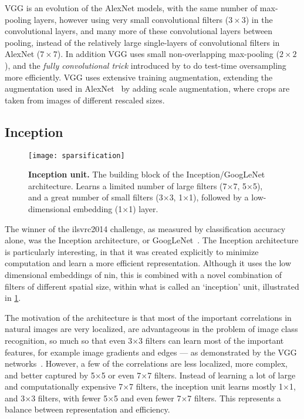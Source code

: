 \documentclass[thesis]{subfiles}
\begin{document}
VGG is an evolution of the AlexNet models, with the same number of max-pooling layers, however using very small convolutional filters ($3 \times 3$) in the convolutional layers, and many more of these convolutional layers between pooling, instead of the relatively large single-layers of convolutional filters in AlexNet ($7\times 7$). In addition VGG uses small non-overlapping max-pooling ($2\times 2$), and the \emph{fully convolutional trick} introduced by \citet{Sermanet2013overfeat} to do test-time oversampling more efficiently. VGG uses extensive training augmentation, extending the augmentation used in AlexNet~\citep{Krizhevsky2012} by adding scale augmentation, where crops are taken from images of different rescaled sizes. 

\subsection{Inception}
\begin{figure}
	\centering
	\texttt{[image: sparsification]}
	\caption[Illustration of the Inception unit.]{\textbf{Inception unit.} The building block of the Inception/GoogLeNet architecture. Learns a limited number of large filters (7$\times$7, 5$\times$5), and a great number of small filters (3$\times$3, 1$\times$1), followed by a low-dimensional embedding (1$\times$1) layer.}\label{fig:inceptionunit}
\end{figure}
The winner of the \gls{ilsvrc}2014 challenge, as measured by classification accuracy alone, was the Inception architecture, or GoogLeNet~\citep{Szegedy2014going}. The Inception architecture is particularly interesting, in that it was created explicitly to minimize computation and learn a more efficient representation. Although it uses the low dimensional embeddings of \gls{nin}, this is combined with a novel combination of filters of different spatial size, within what is called an `inception' unit, illustrated in \cref{fig:inceptionunit}.

The motivation of the architecture is that most of the important correlations in natural images are very localized, are advantageous in the problem of image class recognition, so much so that even 3$\times$3 filters can learn most of the important features, for example image gradients and edges --- as demonstrated by the VGG networks~\citep{Simonyan2014verydeep}. However, a few of the correlations are less localized, more complex, and better captured by 5$\times$5 or even 7$\times$7 filters. Instead of learning a lot of large and computationally expensive 7$\times$7 filters, the inception unit learns mostly 1$\times$1, and 3$\times$3 filters, with fewer 5$\times$5 and even fewer 7$\times$7 filters. This represents a balance between representation and efficiency.
\end{document}
